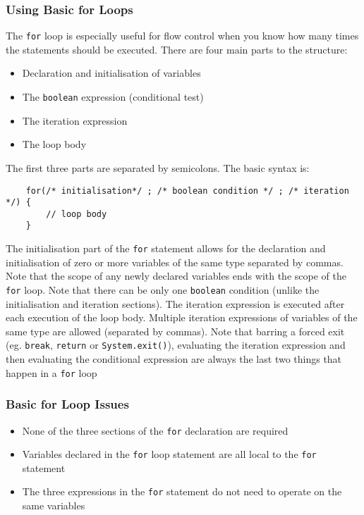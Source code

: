 \subsubsection{Using Basic for Loops}
The \verb#for# loop is especially useful for flow control when you know how 
many times the statements should be executed. There are four main parts to the 
structure:
\begin{itemize}
    \item Declaration and initialisation of variables
    \item The \verb#boolean# expression (conditional test)
    \item The iteration expression
    \item The loop body
\end{itemize}
The first three parts are separated by semicolons. The basic syntax is:
\begin{verbatim}
    for(/* initialisation*/ ; /* boolean condition */ ; /* iteration */) {
        // loop body
    }
\end{verbatim}
The initialisation part of the \verb#for# statement allows for the declaration 
and initialisation of zero or more variables of the same type separated by 
commas. Note that the scope of any newly declared variables ends with the scope 
of the \verb#for# loop. Note that there can be only one \verb#boolean# 
condition (unlike the initialisation and iteration sections). The iteration 
expression is executed after each execution of the loop body. Multiple 
iteration expressions of variables of the same type are allowed (separated by 
commas). Note that barring a forced exit (eg. \verb#break#, \verb#return# or 
\verb#System.exit()#), evaluating the iteration expression and then evaluating 
the conditional expression are always the last two things that happen in a 
\verb#for# loop

\subsubsection{Basic for Loop Issues}
\begin{itemize}
    \item None of the three sections of the \verb#for# declaration are required
    \item Variables declared in the \verb#for# loop statement are all local to 
    the \verb#for# statement
    \item The three expressions in the \verb#for# statement do not need to 
    operate on the same variables
\end{itemize}

